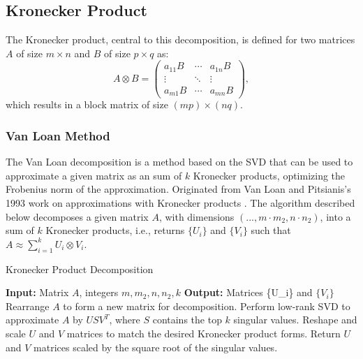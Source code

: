 \documentclass{article}
\begin{document}
{\subsection{Kronecker Product}

The Kronecker product, central to this decomposition, is defined for two matrices \( A \) of size \( m \times n \) and \( B \) of size \( p \times q \) as:
\begin{equation}
    A \otimes B = 
    \begin{pmatrix}
    a_{11}B & \cdots & a_{1n}B \\
    \vdots & \ddots & \vdots \\
    a_{m1}B & \cdots & a_{mn}B
    \end{pmatrix},
\end{equation}
which results in a block matrix of size \( (mp) \times (nq) \).

\subsubsection{Van Loan Method}%
\label{sub:The fuck is Van Loan}

The Van Loan decomposition is a method based on the SVD that can be used to approximate a given matrix as an sum of \( k \) Kronecker products, optimizing the Frobenius norm of the approximation. Originated from Van Loan and Pitsianis's 1993 work on approximations with Kronecker products \cite{van1993approximation}. The algorithm described below decomposes a given matrix \( A \), with dimensions \((..., m \cdot m_2, n \cdot n_2)\), into a sum of \( k \) Kronecker products, i.e., returns \( \{U_i\} \) and \( \{V_i\} \) such that \( A \approx \sum_{i=1}^k U_i \otimes V_i \).

\begin{algorithm}
	\caption{Kronecker Product Decomposition}
	\begin{algorithmic}[1]
		\State \textbf{Input:} Matrix \( A \), integers \( m, m_2, n, n_2, k \)
		\State \textbf{Output:} Matrices  \{U_i\} \) and \( \{V_i\} \) 
		\State Rearrange \( A \) to form a new matrix for decomposition.
		\State Perform low-rank SVD to approximate \( A \) by \( U S V^T \), where \( S \) contains the top \( k \) singular values.
		\State Reshape and scale \( U \) and \( V \) matrices to match the desired Kronecker product forms.
		\State Return \( U \) and \( V \) matrices scaled by the square root of the singular values.
	\end{algorithmic}
\end{algorithm}


}
\end{document}
